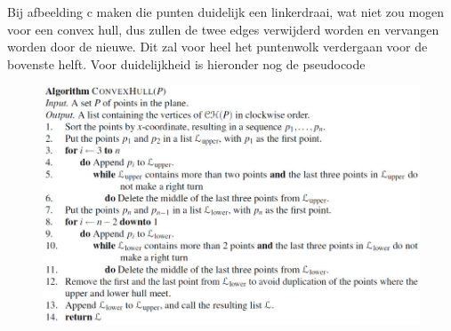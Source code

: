 \documentclass[12pt,a4paper]{article}
\begin{document}
	\begin{figure}[h]
		\centering
		\label{fig:incremental-example}
	\end{figure}
	Bij afbeelding c maken die punten duidelijk een linkerdraai, wat niet zou mogen voor een convex hull, dus zullen de twee edges verwijderd worden en vervangen worden door de nieuwe. Dit zal voor heel het puntenwolk verdergaan voor de bovenste helft. Voor duidelijkheid is hieronder nog de pseudocode
	\begin{figure}[h]
		\centering
		\includegraphics[width=0.9\linewidth]{afbeeldingen/convex-hull}
		\label{fig:convex-hull}
	\end{figure}
\end{document}
